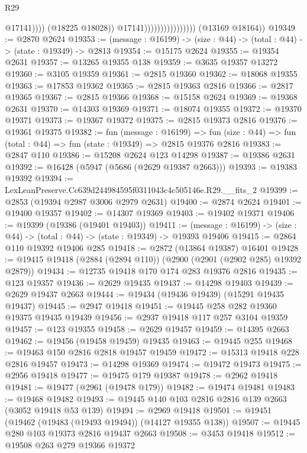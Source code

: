 \begin{lexlean}{R29}
\begin{coremodule}
                                                @17141))))
                                        (@18225 @18028))
                                      @17141))))))))))))))))
      (@13169 @18164))
@19349 := @2870 @2624
@19353 := (message : @16199) -> (size : @44) -> (total : @44) -> (state : @19349) -> @2813
@19354 := @15175 @2624
@19355 := @19354 @2631
@19357 := @13265 @19355 @138
@19359 := @3635 @19357 @13272
@19360 := @3105 @19359
@19361 := @2815 @19360
@19362 := @18068 @19355
@19363 := @17853 @19362
@19365 := @2815 @19363 @2816
@19366 := @2817 @19365
@19367 := @2815 @19366
@19368 := @15158 @2624
@19369 := @19368 @2631
@19370 := @14303 @19369
@19371 := @18074 @19355
@19372 := @19370 @19371
@19373 := @19367 @19372
@19375 := @2815 @19373 @2816
@19376 := @19361 @19375
@19382 := fun (message : @16199) =>
  fun (size : @44) => fun (total : @44) => fun (state : @19349) => @2815 @19376 @2816
@19383 := @2847 @110
@19386 := @15208 @2624 @123 @14298
@19387 := @19386 @2631
@19392 := @16428 (@5947 (@5686 (@2629 @19387 @2663)))
@19393 := @19383 @19392
@19394 := LexLeanPreserve.Cc639d244984595f0311043c4c505146e.R29.__fits_2
@19399 := @2853 (@19394 @2987 @3006 @2979 @2631)
@19400 := @2874 @2624
@19401 := @19400 @19357
@19402 := @14307 @19369
@19403 := @19402 @19371
@19406 := @19399 (@19386 (@19401 @19403))
@19411 := (message : @16199) -> (size : @44) -> (total : @44) -> (state : @19349) -> @19393 @19406
@19415 := @2864 @110 @19392 @19406 @285
@19418 := @2872 (@13864 @19387) @16401
@19428 := @19415 @19418 (@2884 (@2894 @110)) (@2900 (@2901 (@2902 @285) @19392 @2879))
@19434 := @12735 @19418 @170 @174 @283 @19376 @2816
@19435 := @123 @19357
@19436 := @2629 @19435
@19437 := @14298 @19403
@19439 := @2629 @19437 @2663
@19444 := @19434 (@19436 @19439) (@15291 @19435 @19437)
@19445 := @2947 @19418
@19451 := @19445 @258 @282 @19360 @19375 @19435 @19439
@19456 := @2937 @19418 @117 @257 @3104 @19359
@19457 := @123 @19355
@19458 := @2629 @19457
@19459 := @14395 @2663
@19462 := @19456 (@19458 @19459) @19435
@19463 := @19445 @255
@19468 := @19463 @150 @2816 @2818 @19457 @19459
@19472 := @15313 @19418 @228 @2816 @19457
@19473 := @14298 @19369
@19474 := @19472 @19473
@19475 := @2956 @19418
@19477 := @19475 @179 @19387
@19478 := @2962 @19418
@19481 := @19477 (@2961 (@19478 @179))
@19482 := @19474 @19481
@19483 := @19468 @19482
@19493 := @19445 @140 @103 @2816 @2816 @139 @2663 (@3052 @19418 @53 @139)
@19494 := @2969 @19418
@19501 := @19451 (@19462 (@19483 (@19493 @19494)) (@14127 @19355 @138))
@19507 := @19445 @280 @103 @19373 @2816 @19437 @2663
@19508 := @3453 @19418
@19512 := @19508 @263 @279 @19366 @19372

\end{coremodule}
\end{lexlean}

